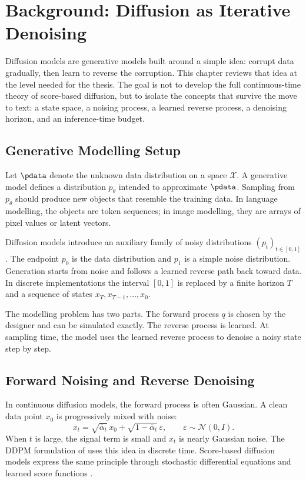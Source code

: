 \chapter{Background: Diffusion as Iterative Denoising}
\label{ch:background-diffusion}

Diffusion models are generative models built around a simple idea: corrupt data
gradually, then learn to reverse the corruption. This chapter reviews that idea
at the level needed for the thesis. The goal is not to develop the full
continuous-time theory of score-based diffusion, but to isolate the concepts
that survive the move to text: a state space, a noising process, a learned
reverse process, a denoising horizon, and an inference-time budget.

\section{Generative Modelling Setup}
\label{sec:ch2-generative-setup}

Let $\pdata$ denote the unknown data distribution on a space $\mathcal{X}$.
A generative model defines a distribution $p_\theta$ intended to approximate
$\pdata$. Sampling from $p_\theta$ should produce new objects that resemble the
training data. In language modelling, the objects are token sequences; in
image modelling, they are arrays of pixel values or latent vectors.

Diffusion models introduce an auxiliary family of noisy distributions
$(p_t)_{t\in[0,1]}$. The endpoint $p_0$ is the data distribution and $p_1$ is a
simple noise distribution. Generation starts from noise and follows a learned
reverse path back toward data. In discrete implementations the interval
$[0,1]$ is replaced by a finite horizon $T$ and a sequence of states
$x_T,x_{T-1},\ldots,x_0$.

The modelling problem has two parts. The forward process $q$ is chosen by the
designer and can be simulated exactly. The reverse process is learned. At
sampling time, the model uses the learned reverse process to denoise a noisy
state step by step.

\section{Forward Noising and Reverse Denoising}
\label{sec:ch2-forward-reverse}

In continuous diffusion models, the forward process is often Gaussian. A clean
data point $x_0$ is progressively mixed with noise:
\[
  x_t = \sqrt{\bar{\alpha}_t}\,x_0
        + \sqrt{1-\bar{\alpha}_t}\,\varepsilon,
  \qquad \varepsilon \sim \mathcal{N}(0,I).
\]
When $t$ is large, the signal term is small and $x_t$ is nearly Gaussian noise.
The DDPM formulation of \textcite{ho2020ddpm} uses this idea in discrete time.
Score-based diffusion models express the same principle through stochastic
differential equations and learned score functions \parencite{song2021score}.

